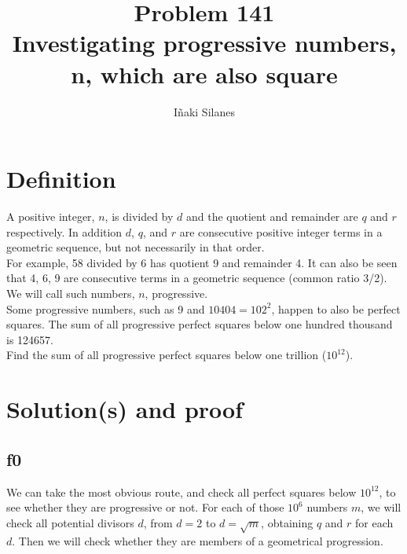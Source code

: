 \documentclass[english]{article}
\begin{document}
\newcommand{\mc}{\multicolumn}
\newcommand{\mr}{\multirow}
\newcommand{\cw}{\columnwidth}
\newcommand{\ig}[2]{\texttt{[image: \#2]}}

\title{Problem 141\\Investigating progressive numbers, n, which are also square}
\author{I\~naki Silanes}
\maketitle

\section{Definition}

A positive integer, $n$, is divided by $d$ and the quotient and remainder are $q$ and $r$ respectively. In addition $d$, $q$, and $r$ are consecutive positive integer terms in a geometric sequence, but not necessarily in that order.\\

For example, 58 divided by 6 has quotient 9 and remainder 4. It can also be seen that 4, 6, 9 are consecutive terms in a geometric sequence (common ratio 3/2).\\

We will call such numbers, $n$, progressive.\\

Some progressive numbers, such as 9 and $10404 = 102^2$, happen to also be perfect squares. The sum of all progressive perfect squares below one hundred thousand is 124657.\\

Find the sum of all progressive perfect squares below one trillion ($10^12$).

\section{Solution(s) and proof}

\subsection{f0}

We can take the most obvious route, and check all perfect squares below $10^{12}$, to see whether they are progressive or not. For each of those $10^6$ numbers $m$, we will check all potential divisors $d$, from $d=2$ to $d=\sqrt{m}$, obtaining $q$ and $r$ for each $d$. Then we will check whether they are members of a geometrical progression.\\
\end{document}
